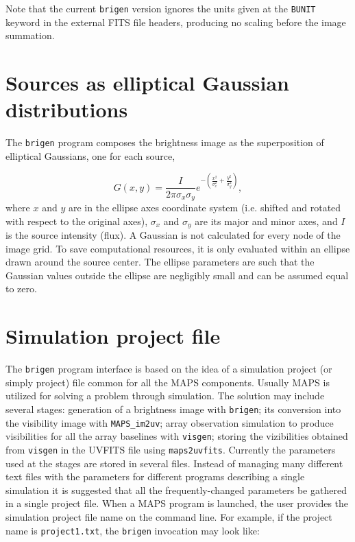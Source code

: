 \documentclass[letterpaper, oneside, 11pt]{article}
\begin{document}
Note that the current {\tt brigen} version ignores the units given at the {\tt BUNIT} keyword in the external FITS file headers, producing no scaling before the image summation. 

\section{Sources as elliptical Gaussian distributions}
 
The {\tt brigen} program composes the brightness image as the superposition of elliptical Gaussians, one for each source,

\begin{equation}
 G(x,y) = \frac{I}{2 \pi \sigma_x \sigma_y}e^{-\left(\frac{x^2}{\sigma_x^2} + \frac{y^2}{\sigma_y^2} \right)},
\end{equation}
where $x$ and $y$ are in the ellipse axes coordinate system (i.e. shifted and rotated with respect to the original axes), $\sigma_x$ and $\sigma_y$ are its major and minor axes, and $I$ is the source intensity (flux). A Gaussian is not calculated for every node of the image grid. To save computational resources, it is only evaluated within an ellipse drawn around the source center. The ellipse parameters are such that the Gaussian values outside the ellipse are negligibly small and can be assumed equal to zero.

\section{Simulation project file}

The {\tt brigen} program interface is based on the idea of a simulation project (or simply project) file common for all the MAPS components. Usually MAPS is utilized for solving a problem through simulation. The solution may include several stages: generation of a brightness image with {\tt brigen}; its conversion into the visibility image with {\tt MAPS\_im2uv}; array observation simulation to produce visibilities for all the array baselines with {\tt visgen}; storing the vizibilities obtained from {\tt visgen} in the UVFITS file using {\tt maps2uvfits}. Currently the parameters used at the stages are stored in several files. Instead of managing many different text files with the parameters for different programs describing a single simulation it is suggested that all the frequently-changed parameters be gathered in a single project file. When a MAPS program is launched, the user provides the simulation project file name on the command line. For example, if the project name is {\tt project1.txt}, the {\tt brigen} invocation may look like:\\
\end{document}
